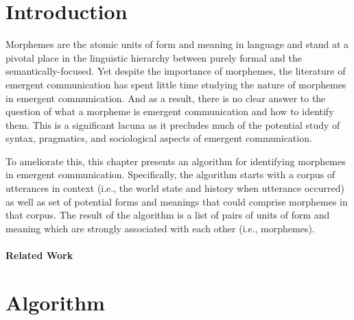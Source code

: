 \section{Introduction}

Morphemes are the atomic units of form and meaning in language and stand at a pivotal place in the linguistic hierarchy between purely formal and the semantically-focused.
Yet despite the importance of morphemes, the literature of emergent communication has spent little time studying the nature of morphemes in emergent communication.
And as a result, there is no clear answer to the question of what a morpheme is emergent communication and how to identify them.
This is a significant lacuna as it precludes much of the potential study of syntax, pragmatics, and sociological aspects of emergent communication.

To ameliorate this, this chapter presents an algorithm for identifying morphemes in emergent communication.
Specifically, the algorithm starts with a corpus of utterances in context (i.e., the world state and history when utterance occurred) as well as set of potential forms and meanings that could comprise morphemes in that corpus.
The result of the algorithm is a list of pairs of units of form and meaning which are strongly associated with each other (i.e., morphemes).



\paragraph{Related Work}

\section{Algorithm}

